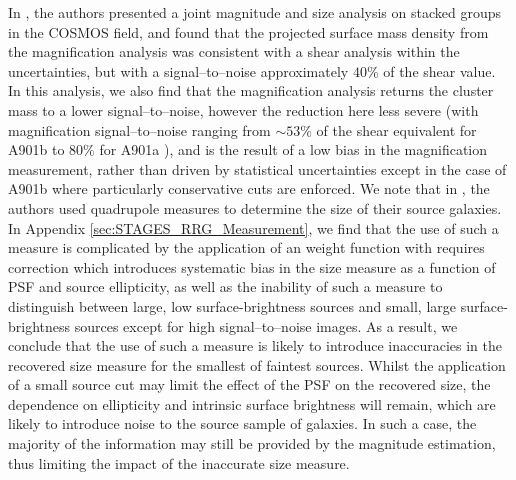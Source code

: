 \documentclass[useAMS,usenatbib,times,letter,amssymb]{mn2e}
\begin{document}
In \cite{Schmidt:2012p1106}, the authors presented a joint magnitude and size analysis on stacked groups in the COSMOS field, and found that the projected surface mass density from the magnification analysis was consistent with a shear analysis within the uncertainties, but with a signal--to--noise approximately $40\%$ of the shear value. In this analysis, we also find that the magnification analysis returns the cluster mass to a lower signal--to--noise, however the reduction here less severe (with magnification signal--to--noise ranging from $\sim 53\%$ of the shear equivalent for A901b to $80\%$ for A901a ), and is the result of a low bias in the magnification measurement, rather than driven by statistical uncertainties except in the case of A901b where particularly conservative cuts are enforced. We note that in \cite{Schmidt:2012p1106}, the authors used quadrupole measures to determine the size of their source galaxies. In Appendix \ref{sec:STAGES_RRG_Measurement}, we find that the use of such a measure is complicated by the application of an weight function with requires correction which introduces systematic bias in the size measure as a function of PSF and source ellipticity, as well as the inability of such a measure to distinguish between large, low surface-brightness sources and small, large surface-brightness sources except for high signal--to--noise images. As a result, we conclude that the use of such a measure is likely to introduce inaccuracies in the recovered size measure for the smallest of faintest sources. Whilst the application of a small source cut may limit the effect of the PSF on the recovered size, the dependence on ellipticity and intrinsic surface brightness will remain, which are likely to introduce noise to the source sample of galaxies. In such a case, the majority of the information may still be provided by the magnitude estimation, thus limiting the impact of the inaccurate size measure.
\end{document}

